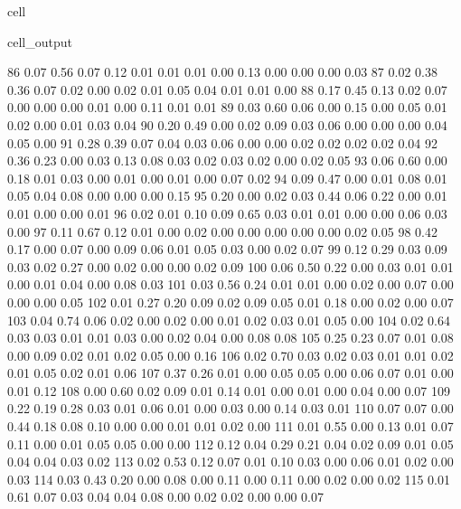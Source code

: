 \documentclass[letterpaper,10pt,french]{sphinxmanual}
\begin{document}
\begin{sphinxuseclass}{cell}
\begin{sphinxuseclass}{cell_output}
\begin{sphinxVerbatim}[commandchars=\\\{\}]
        86	0.07 	0.56 	0.07 	0.12 	0.01 	0.01 	0.01 	0.00 	0.13 	0.00 	0.00 	0.00 	0.03
        87	0.02 	0.38 	0.36 	0.07 	0.02 	0.00 	0.02 	0.01 	0.05 	0.04 	0.01 	0.01 	0.00
        88	0.17 	0.45 	0.13 	0.02 	0.07 	0.00 	0.00 	0.00 	0.01 	0.00 	0.11 	0.01 	0.01
        89	0.03 	0.60 	0.06 	0.00 	0.15 	0.00 	0.05 	0.01 	0.02 	0.00 	0.01 	0.03 	0.04
        90	0.20 	0.49 	0.00 	0.02 	0.09 	0.03 	0.06 	0.00 	0.00 	0.00 	0.04 	0.05 	0.00
        91	0.28 	0.39 	0.07 	0.04 	0.03 	0.06 	0.00 	0.00 	0.02 	0.02 	0.02 	0.02 	0.04
        92	0.36 	0.23 	0.00 	0.03 	0.13 	0.08 	0.03 	0.02 	0.03 	0.02 	0.00 	0.02 	0.05
        93	0.06 	0.60 	0.00 	0.18 	0.01 	0.03 	0.00 	0.01 	0.00 	0.01 	0.00 	0.07 	0.02
        94	0.09 	0.47 	0.00 	0.01 	0.08 	0.01 	0.05 	0.04 	0.08 	0.00 	0.00 	0.00 	0.15
        95	0.20 	0.00 	0.02 	0.03 	0.44 	0.06 	0.22 	0.00 	0.01 	0.01 	0.00 	0.00 	0.01
        96	0.02 	0.01 	0.10 	0.09 	0.65 	0.03 	0.01 	0.01 	0.00 	0.00 	0.06 	0.03 	0.00
        97	0.11 	0.67 	0.12 	0.01 	0.00 	0.02 	0.00 	0.00 	0.00 	0.00 	0.00 	0.02 	0.05
        98	0.42 	0.17 	0.00 	0.07 	0.00 	0.09 	0.06 	0.01 	0.05 	0.03 	0.00 	0.02 	0.07
        99	0.12 	0.29 	0.03 	0.09 	0.03 	0.02 	0.27 	0.00 	0.02 	0.00 	0.00 	0.02 	0.09
       100	0.06 	0.50 	0.22 	0.00 	0.03 	0.01 	0.01 	0.00 	0.01 	0.04 	0.00 	0.08 	0.03
       101	0.03 	0.56 	0.24 	0.01 	0.01 	0.00 	0.02 	0.00 	0.07 	0.00 	0.00 	0.00 	0.05
       102	0.01 	0.27 	0.20 	0.09 	0.02 	0.09 	0.05 	0.01 	0.18 	0.00 	0.02 	0.00 	0.07
       103	0.04 	0.74 	0.06 	0.02 	0.00 	0.02 	0.00 	0.01 	0.02 	0.03 	0.01 	0.05 	0.00
       104	0.02 	0.64 	0.03 	0.03 	0.01 	0.01 	0.03 	0.00 	0.02 	0.04 	0.00 	0.08 	0.08
       105	0.25 	0.23 	0.07 	0.01 	0.08 	0.00 	0.09 	0.02 	0.01 	0.02 	0.05 	0.00 	0.16
       106	0.02 	0.70 	0.03 	0.02 	0.03 	0.01 	0.01 	0.02 	0.01 	0.05 	0.02 	0.01 	0.06
       107	0.37 	0.26 	0.01 	0.00 	0.05 	0.05 	0.00 	0.06 	0.07 	0.01 	0.00 	0.01 	0.12
       108	0.00 	0.60 	0.02 	0.09 	0.01 	0.14 	0.01 	0.00 	0.01 	0.00 	0.04 	0.00 	0.07
       109	0.22 	0.19 	0.28 	0.03 	0.01 	0.06 	0.01 	0.00 	0.03 	0.00 	0.14 	0.03 	0.01
       110	0.07 	0.07 	0.00 	0.44 	0.18 	0.08 	0.10 	0.00 	0.00 	0.01 	0.01 	0.02 	0.00
       111	0.01 	0.55 	0.00 	0.13 	0.01 	0.07 	0.11 	0.00 	0.01 	0.05 	0.05 	0.00 	0.00
       112	0.12 	0.04 	0.29 	0.21 	0.04 	0.02 	0.09 	0.01 	0.05 	0.04 	0.04 	0.03 	0.02
       113	0.02 	0.53 	0.12 	0.07 	0.01 	0.10 	0.03 	0.00 	0.06 	0.01 	0.02 	0.00 	0.03
       114	0.03 	0.43 	0.20 	0.00 	0.08 	0.00 	0.11 	0.00 	0.11 	0.00 	0.02 	0.00 	0.02
       115	0.01 	0.61 	0.07 	0.03 	0.04 	0.04 	0.08 	0.00 	0.02 	0.02 	0.00 	0.00 	0.07

\end{sphinxVerbatim}
\end{sphinxuseclass}
\end{sphinxuseclass}
\end{document}
